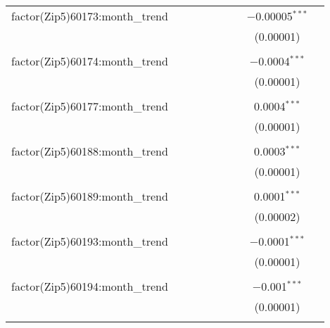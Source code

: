 \begin{table}[H]
{\begin{tabular}{@{\extracolsep{5pt}}lcccccccc}
  factor(Zip5)60173:month\_trend &  &  &  &  &  &  & $-$0.00005$^{***}$ &  \\  

   &  &  &  &  &  &  & (0.00001) &  \\  

   & & & & & & & & \\  

  factor(Zip5)60174:month\_trend &  &  &  &  &  &  & $-$0.0004$^{***}$ &  \\  

   &  &  &  &  &  &  & (0.00001) &  \\  

   & & & & & & & & \\  

  factor(Zip5)60177:month\_trend &  &  &  &  &  &  & 0.0004$^{***}$ &  \\  

   &  &  &  &  &  &  & (0.00001) &  \\  

   & & & & & & & & \\  

  factor(Zip5)60188:month\_trend &  &  &  &  &  &  & 0.0003$^{***}$ &  \\  

   &  &  &  &  &  &  & (0.00001) &  \\  

   & & & & & & & & \\  

  factor(Zip5)60189:month\_trend &  &  &  &  &  &  & 0.0001$^{***}$ &  \\  

   &  &  &  &  &  &  & (0.00002) &  \\  

   & & & & & & & & \\  

  factor(Zip5)60193:month\_trend &  &  &  &  &  &  & $-$0.0001$^{***}$ &  \\  

   &  &  &  &  &  &  & (0.00001) &  \\  

   & & & & & & & & \\  

  factor(Zip5)60194:month\_trend &  &  &  &  &  &  & $-$0.001$^{***}$ &  \\  

   &  &  &  &  &  &  & (0.00001) &  \\  

   & & & & & & & & \\  


\end{tabular}}
\end{table}
